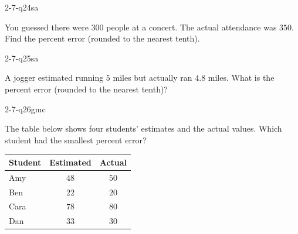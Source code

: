 \begin{practiceQuestion}{2-7-q24}{sa}
\begin{questionText}
You guessed there were $300$ people at a concert. The actual attendance was $350$. Find the percent error (rounded to the nearest tenth).
\end{questionText}
\end{practiceQuestion}

\begin{practiceQuestion}{2-7-q25}{sa}
\begin{questionText}
A jogger estimated running $5$ miles but actually ran $4.8$ miles. What is the percent error (rounded to the nearest tenth)?
\end{questionText}
\end{practiceQuestion}


\begin{practiceQuestion}{2-7-q26}{gmc}
\begin{questionText}
The table below shows four students' estimates and the actual values. Which student had the smallest percent error?

\begin{center}
\begin{tabular}{|l|c|c|}
\hline
\textbf{Student} & \textbf{Estimated} & \textbf{Actual} \\
\hline
Amy & $48$ & $50$ \\
\hline
Ben & $22$ & $20$ \\
\hline
Cara & $78$ & $80$ \\
\hline
Dan & $33$ & $30$ \\
\hline
\end{tabular}
\end{center}
\end{questionText}
\end{practiceQuestion}

